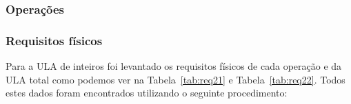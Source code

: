 \documentclass[12pt]{article}
\begin{document}
\subsubsection{Operações}
\label{subsubsec:2op}


\subsubsection{Requisitos físicos}
\label{subsubsec:ulafis}

Para a ULA de inteiros foi levantado os requisitos físicos de cada operação e da ULA total como podemos ver na Tabela~\ref{tab:req21} e Tabela~\ref{tab:req22}. Todos estes dados foram encontrados utilizando o seguinte procedimento:
\end{document}
